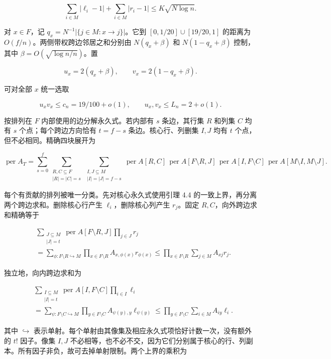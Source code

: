 \documentclass[11pt,a4paper]{article}
\begin{document}
\[
\sum_{i\in M}|\ell_i-1|+\sum_{i\in M}|r_i-1|
\le K\sqrt{N\log n}.
\]

对 \(x\in F\)，记 \(q_x=N^{-1}|\{j\in M:x\to j\}|\)。它到 \([0,1/20]\cup[19/20,1]\) 的距离为 \(O(f/n)\)。两侧带权跨边邻居之和分别由 \(N(q_x+\beta)\) 和 \(N(1-q_x+\beta)\) 控制，其中 \(\beta=O(\sqrt{\log n/n})\)。置

\[
u_x=2(q_x+\beta),\qquad v_x=2(1-q_x+\beta).
\]

可对全部 \(x\) 统一选取

\[
u_xv_x\le c_n=19/100+o(1),\qquad
u_x,v_x\le L_n=2+o(1).
\]

按排列在 \(F\) 内部使用的边分解永久式。若内部有 \(s\) 条边，其行集 \(R\) 和列集 \(C\) 均有 \(s\) 个点；每个跨边方向恰有 \(t=f-s\) 条边。核心行、列删集 \(I,J\) 均有 \(t\) 个点，但不必相同。精确四块展开为

\[
\operatorname{per}A_T
=\sum_{s=0}^{f}
\sum_{\substack{R,C\subseteq F\\|R|=|C|=s}}
\sum_{\substack{I,J\subseteq M\\|I|=|J|=f-s}}
\operatorname{per}A[R,C]\,
\operatorname{per}A[F\setminus R,J]\,
\operatorname{per}A[I,F\setminus C]\,
\operatorname{per}A[M\setminus I,M\setminus J].
\]

每个有贡献的排列被唯一分类。先对核心永久式使用引理 4.4 的一致上界，再分离两个跨边求和。删除核心行产生 \(\ell_i\)，删除核心列产生 \(r_j\)。固定 \(R,C\)，向外跨边求和精确等于

\[
\begin{aligned}
&\sum_{\substack{J\subseteq M\\|J|=t}}
\operatorname{per}A[F\setminus R,J]\prod_{j\in J}r_j\\
&=\sum_{\phi:F\setminus R\hookrightarrow M}
\prod_{x\in F\setminus R}A_{x,\phi(x)}r_{\phi(x)}
\le\prod_{x\in F\setminus R}\sum_{j\in M}A_{xj}r_j.
\end{aligned}
\]

独立地，向内跨边求和为

\[
\begin{aligned}
&\sum_{\substack{I\subseteq M\\|I|=t}}
\operatorname{per}A[I,F\setminus C]\prod_{i\in I}\ell_i\\
&=\sum_{\psi:F\setminus C\hookrightarrow M}
\prod_{y\in F\setminus C}A_{\psi(y),y}\ell_{\psi(y)}
\le\prod_{y\in F\setminus C}\sum_{i\in M}A_{iy}\ell_i.
\end{aligned}
\]

其中 \(\hookrightarrow\) 表示单射。每个单射由其像集及相应永久式项恰好计数一次，没有额外的 \(t!\) 因子。像集 \(I,J\) 不必相等，也不必不交，因为它们分别属于核心的行、列副本。所有因子非负，故可去掉单射限制。两个上界的乘积为
\end{document}
